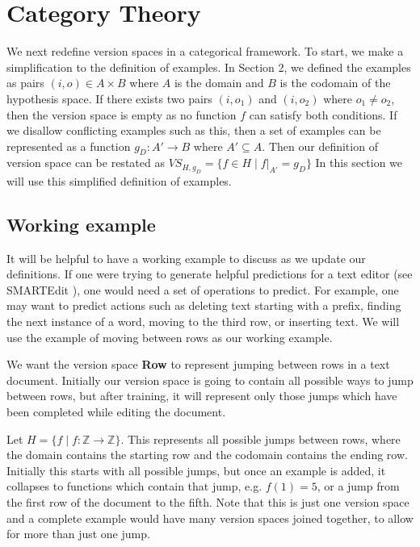 \documentclass{article}
\theoremstyle{definition}
\begin{document}
\section{Category Theory}
We next redefine version spaces in a categorical framework. To start, we make a simplification to the definition of examples. In Section 2, we defined the examples as pairs $(i, o) \in A\times B$ where $A$ is the domain and $B$ is the codomain of the hypothesis space. If there exists two pairs $(i, o_1)$ and $(i, o_2)$ where $o_1\neq o_2$, then the version space is empty as no function $f$ can satisfy both conditions. If we disallow conflicting examples such as this, then a set of examples can be represented as a function $g_D : A' \rightarrow B$ where $A' \subseteq A$. Then our definition of version space can be restated as $VS_{H,g_D} = \{f \in H \mid f|_{A'} = g_D\}$ In this section we will use this simplified definition of examples.


\subsection{Working example}
It will be helpful to have a working example to discuss as we update our definitions. If one were trying to generate helpful predictions for a text editor (see SMARTEdit \cite{short}), one would need a set of operations to predict. For example, one may want to predict actions such as deleting text starting with a prefix, finding the next instance of a word, moving to the third row, or inserting text. We will use the example of moving between rows as our working example. 

We want the version space \textbf{Row} to represent jumping between rows in a text document. Initially our version space is going to contain all possible ways to jump between rows, but after training, it will represent only those jumps which have been completed while editing the document. 

Let $H = \{f \mid f: \mathbb{Z} \rightarrow \mathbb{Z}\}$. This represents all possible jumps between rows, where the domain contains the starting row and the codomain contains the ending row. Initially this starts with all possible jumps, but once an example is added, it collapses to functions which contain that jump, e.g. $f(1) = 5$, or a jump from the first row of the document to the fifth. Note that this is just one version space and a complete example would have many version spaces joined together, to allow for more than just one jump. 
\end{document}

